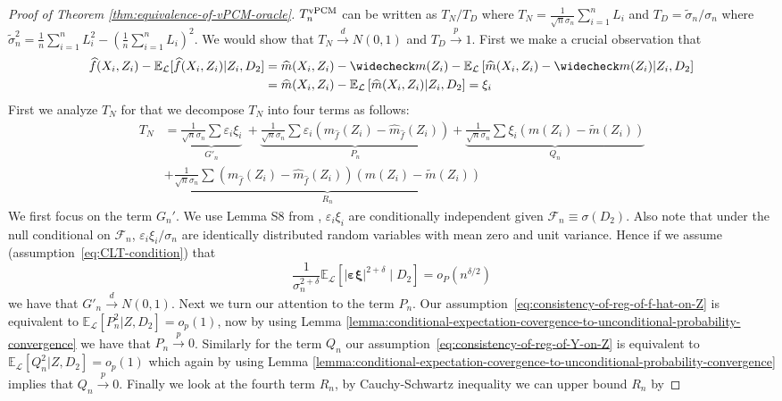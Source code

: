 \documentclass[12pt]{article}
\theoremstyle{definition}
\theoremstyle{remark}
\newcommand{\E}{\mathbb E}								%
\newcommand{\srx}{X}									%
\newcommand{\srz}{Z}									%
\newcommand{\law}{\mathcal L}							%
\begin{document}
\begin{proof}[Proof of Theorem \ref{thm:equivalence-of-vPCM-oracle}]
	$T_n^{\textnormal{vPCM}}$ can be written as $T_N/T_D$ where $T_N = \frac{1}{\sqrt n \sigma_n} \sum_{i=1}^n L_i$ and $T_D = \widetilde \sigma_n/\sigma_n$ where $\widetilde \sigma_n^2 = \frac{1}{n}\sum_{i=1}^n L_i^2 - \left(\frac{1}{n} \sum_{i=1}^n L_i\right)^2$.
	We would show that $T_N \overset{d}{\to} N(0,1)$ and $T_D \overset{p}{\to} 1$.
	First we make a crucial observation that
	\begin{align*}
		\widehat f(\srx_i,\srz_i) - \E_{\law}[\widehat{f} (\srx_i,\srz_i) | \srz_i,D_2] &= \widehat m(\srx_i,\srz_i) - \widecheck m(\srz_i) - \E_{\law}\left[\widehat m(\srx_i,\srz_i) - \widecheck m(\srz_i) | \srz_i,D_2 \right]\\
		&= \widehat m(\srx_i,\srz_i) - \E_{\law}\left[\widehat m(\srx_i,\srz_i)  | \srz_i,D_2 \right] = \xi_i
	\end{align*}
	First we analyze $T_N$ for that we decompose $T_N$ into four terms as follows:
	\begin{align*}
		T_N &= \underbrace{\frac{1}{\sqrt n \sigma_n} \sum \varepsilon_i\xi_i}_{G'_n}\
		+ \underbrace{\frac{1}{\sqrt n \sigma_n} \sum \varepsilon_i(m_{\widehat f}(\srz_i) -\widehat m_{\widehat f}(\srz_i))}_{P_n} 
		+\underbrace{\frac{1}{\sqrt n\sigma_n} \sum\xi_i( m(\srz_i) - \widetilde m(\srz_i))}_{Q_n} \\
		&+ \underbrace{\frac{1}{\sqrt n \sigma_n} \sum (m_{\widehat f}(\srz_i) -\widehat m_{\widehat f}(\srz_i))( m(\srz_i) - \widetilde m(\srz_i))}_{R_n}
	\end{align*}
	We first focus on the term $G_n'$. 
	We use Lemma S8 from \citep{Lundborg2022a}, $\varepsilon_i\xi_i$ are conditionally independent given $\mathcal F_n \equiv \sigma(D_2)$. Also note that under the null conditional on $\mathcal{F}_n$, $\varepsilon_i\xi_i/\sigma_n$ are identically distributed random variables with mean zero and unit variance. Hence if we assume (assumption~\eqref{eq:CLT-condition}) that 
	$$
	\frac{1}{\sigma_n^{2+\delta}}\E_\law\left[|\bm\varepsilon\bm\xi|^{2+\delta} \mid D_2\right] = o_P(n^{\delta/2})
	$$
	we have that  $G'_n \overset{d}{\to} N(0,1)$. Next we turn our attention to the term $P_n$.  Our assumption~\eqref{eq:consistency-of-reg-of-f-hat-on-Z} is equivalent to $\E_{\law}[P_n^2 | \srz,D_2] = o_p(1)$, now by using Lemma \ref{lemma:conditional-expectation-covergence-to-unconditional-probability-convergence} we have that $P_n \overset{p}{\to} 0$. Similarly for the term $Q_n$ our assumption~\eqref{eq:consistency-of-reg-of-Y-on-Z}  is equivalent to $\E_{\law}[Q_n^2 | \srz,D_2] = o_p(1)$ which again by using Lemma \ref{lemma:conditional-expectation-covergence-to-unconditional-probability-convergence} implies that $Q_n \overset{p}{\to} 0$. Finally we look at the fourth term $R_n$, by Cauchy-Schwartz inequality we can upper bound $R_n$ by

\end{proof}
\end{document}
